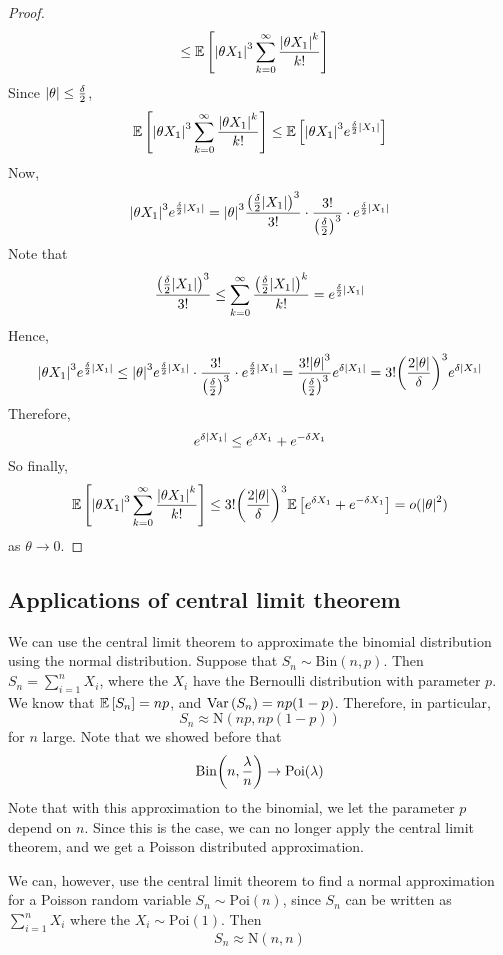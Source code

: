 \begin{proof}
\begin{align*}
		                                                          & \leq \mathbb{E}\left[{\abs{\theta X_1}^3 \sum_{k=0}^\infty \frac{\abs{\theta X_1}^k}{k!}}\right]
	\end{align*}
	Since \(\abs{\theta} \leq \frac{\delta}{2}\),
	\[
		\mathbb{E}\left[{\abs{\theta X_1}^3 \sum_{k=0}^\infty \frac{\abs{\theta X_1}^k}{k!}}\right] \leq \mathbb{E}\left[{\abs{\theta X_1}^3 e^{\frac{\delta}{2}\abs{X_1}}}\right]
	\]
	Now,
	\[
		\abs{\theta X_1}^3 e^{\frac{\delta}{2}\abs{X_1}} = \abs{\theta}^3 \frac{\qty(\frac{\delta}{2}\abs{X_1})^3}{3!} \cdot \frac{3!}{\qty(\frac{\delta}{2})^3} \cdot e^{\frac{\delta}{2}\abs{X_1}}
	\]
	Note that
	\[
		\frac{\qty(\frac{\delta}{2}\abs{X_1})^3}{3!} \leq \sum_{k=0}^\infty \frac{\qty(\frac{\delta}{2}\abs{X_1})^k}{k!} = e^{\frac{\delta}{2}\abs{X_1}}
	\]
	Hence,
	\[
		\abs{\theta X_1}^3 e^{\frac{\delta}{2}\abs{X_1}} \leq \abs{\theta}^3 e^{\frac{\delta}{2}\abs{X_1}} \cdot \frac{3!}{\qty(\frac{\delta}{2})^3} \cdot e^{\frac{\delta}{2}\abs{X_1}} = \frac{3!\abs{\theta}^3}{\qty(\frac{\delta}{2})^3}e^{\delta\abs{X_1}} = 3!\qty(\frac{2\abs{\theta}}{\delta})^3 e^{\delta \abs{X_1}}
	\]
	Therefore,
	\[
		e^{\delta \abs{X_1}} \leq e^{\delta X_1} + e^{-\delta X_1}
	\]
	So finally,
	\[
		\mathbb{E}\left[{\abs{\theta X_1}^3 \sum_{k=0}^\infty \frac{\abs{\theta X_1}^k}{k!}}\right] \leq 3!\qty(\frac{2\abs{\theta}}{\delta})^3 \mathbb{E}\left[{e^{\delta X_1} + e^{-\delta X_1}}\right] = o(\abs{\theta}^2)
	\]
	as \(\theta \to 0\).
\end{proof}

\subsection{Applications of central limit theorem}
We can use the central limit theorem to approximate the binomial distribution using the normal distribution.
Suppose that \(S_n \sim \mathrm{Bin}(n, p)\).
Then \(S_n = \sum_{i=1}^n X_i\), where the \(X_i\) have the Bernoulli distribution with parameter \(p\).
We know that \(\mathbb{E}\left[{S_n}\right] = np\), and \(\operatorname{Var}\left({S_n}\right) = np(1-p)\).
Therefore, in particular,
\[
	S_n \approx \mathrm{N}(np, np(1-p))
\]
for \(n\) large.
Note that we showed before that
\[
	\mathrm{Bin}\qty(n, \frac{\lambda}{n}) \to \mathrm{Poi}(\lambda)
\]
Note that with this approximation to the binomial, we let the parameter \(p\) depend on \(n\).
Since this is the case, we can no longer apply the central limit theorem, and we get a Poisson distributed approximation.

We can, however, use the central limit theorem to find a normal approximation for a Poisson random variable \(S_n \sim \mathrm{Poi}(n)\), since \(S_n\) can be written as \(\sum_{i=1}^n X_i\) where the \(X_i \sim \mathrm{Poi}(1)\).
Then
\[
	S_n \approx \mathrm{N}(n, n)
\]

